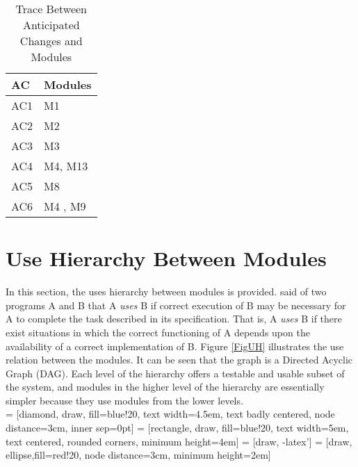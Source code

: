\documentclass[12pt, titlepage]{article}
\begin{document}
\begin{table}[H]
\centering
\begin{tabular}{p{} p{}}
\toprule
\textbf{AC} & \textbf{Modules}\\
\midrule
AC1 & M1\\
AC2 & M2\\
AC3 & M3\\
AC4 & M4, M13\\
AC5 & M8\\ 
AC6 & M4 , M9\\
\bottomrule
\end{tabular}
\caption{Trace Between Anticipated Changes and Modules}
\label{TblACT}
\end{table}

\section{Use Hierarchy Between Modules} \label{SecUse}

In this section, the uses hierarchy between modules is
provided. \citet{Parnas1978} said of two programs A and B that A {\em uses} B if
correct execution of B may be necessary for A to complete the task described in
its specification. That is, A {\em uses} B if there exist situations in which
the correct functioning of A depends upon the availability of a correct
implementation of B.  Figure \ref{FigUH} illustrates the use relation between
the modules. It can be seen that the graph is a Directed Acyclic Graph
(DAG). Each level of the hierarchy offers a testable and usable subset of the
system, and modules in the higher level of the hierarchy are essentially simpler
because they use modules from the lower levels. \\



 = [diamond, draw, fill=blue!20, 
text width=4.5em, text badly centered, node distance=3cm, inner sep=0pt]
 = [rectangle, draw, fill=blue!20, 
text width=5em, text centered, rounded corners, minimum height=4em]
 = [draw, -latex']
 = [draw, ellipse,fill=red!20, node distance=3cm,
minimum height=2em] 
\end{document}
